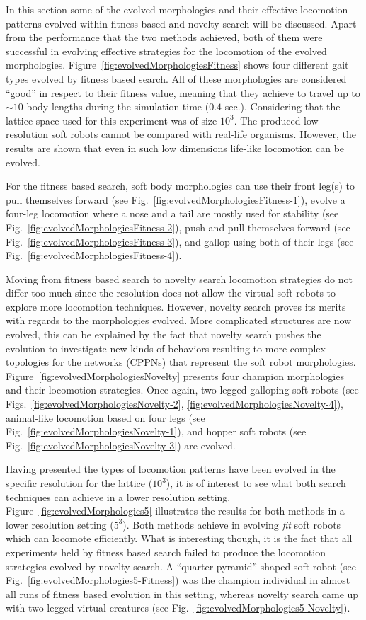 In this section some of the evolved morphologies and their effective locomotion patterns evolved within fitness based and novelty search will be discussed. Apart from the performance that the two methods achieved, both of them were successful in evolving effective strategies for the locomotion of the evolved morphologies. Figure~\ref{fig:evolvedMorphologiesFitness} shows four different gait types evolved by fitness based search. All of these morphologies are considered ``good'' in respect to their fitness value, meaning that they achieve to travel up to $\sim 10$ body lengths during the simulation time ($0.4$ sec.). Considering that the lattice space used for this experiment was of size $10^3$. The produced low-resolution soft robots cannot be compared with real-life organisms. However, the results are shown that even in such low dimensions life-like locomotion can be evolved. 

For the fitness based search, soft body morphologies can use their front leg(s) to pull themselves forward (see Fig.~\ref{fig:evolvedMorphologiesFitness-1}), evolve a four-leg locomotion where a nose and a tail are mostly used for stability (see Fig.~\ref{fig:evolvedMorphologiesFitness-2}), push and pull themselves forward (see Fig.~\ref{fig:evolvedMorphologiesFitness-3}), and gallop using both of their legs (see Fig.~\ref{fig:evolvedMorphologiesFitness-4}). 

Moving from fitness based search to novelty search locomotion strategies do not differ too much since the resolution does not allow the virtual soft robots to explore more locomotion techniques. However, novelty search proves its merits with regards to the morphologies evolved. More complicated structures are now evolved, this can be explained by the fact that novelty search pushes the evolution to investigate new kinds of behaviors resulting to more complex topologies for the networks (CPPNs) that represent the soft robot morphologies. Figure~\ref{fig:evolvedMorphologiesNovelty} presents four champion morphologies and their locomotion strategies. Once again, two-legged galloping soft robots (see Figs.~\ref{fig:evolvedMorphologiesNovelty-2}, \ref{fig:evolvedMorphologiesNovelty-4}), animal-like locomotion based on four legs (see Fig.~\ref{fig:evolvedMorphologiesNovelty-1}), and hopper soft robots (see Fig.~\ref{fig:evolvedMorphologiesNovelty-3}) are evolved.

Having presented the types of locomotion patterns have been evolved in the specific resolution for the lattice ($10^3$), it is of interest to see what both search techniques can achieve in a lower resolution setting. Figure~\ref{fig:evolvedMorphologies5} illustrates the results for both methods in a lower resolution setting ($5^3$). Both methods achieve in evolving \emph{fit} soft robots which can locomote efficiently. What is interesting though, it is the fact that all experiments held by fitness based search failed to produce the locomotion strategies evolved by novelty search. A ``quarter-pyramid'' shaped soft robot (see Fig.~\ref{fig:evolvedMorphologies5-Fitness}) was the champion individual in almost all runs of fitness based evolution in this setting, whereas novelty search came up with two-legged virtual creatures (see Fig.~\ref{fig:evolvedMorphologies5-Novelty}).

